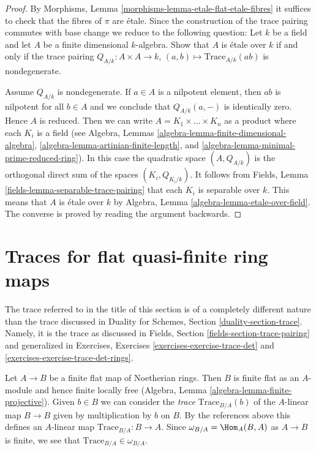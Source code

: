 \begin{proof}
By Morphisms, Lemma \ref{morphisms-lemma-etale-flat-etale-fibres}
it suffices to check that the fibres of $\pi$ are \'etale.
Since the construction of the trace pairing commutes with base
change we reduce to the following question: Let $k$ be a field
and let $A$ be a finite dimensional $k$-algebra. Show that
$A$ is \'etale over $k$ if and only if the trace pairing
$Q_{A/k} : A \times A \to k$, $(a, b) \mapsto \text{Trace}_{A/k}(ab)$
is nondegenerate.

\medskip\noindent
Assume $Q_{A/k}$ is nondegenerate. If $a \in A$ is a nilpotent element, then
$ab$ is nilpotent for all $b \in A$ and we conclude that $Q_{A/k}(a, -)$ is
identically zero. Hence $A$ is reduced. Then we can write
$A = K_1 \times \ldots \times K_n$ as a product where each $K_i$
is a field (see
Algebra, Lemmas \ref{algebra-lemma-finite-dimensional-algebra},
\ref{algebra-lemma-artinian-finite-length}, and
\ref{algebra-lemma-minimal-prime-reduced-ring}).
In this case the quadratic
space $(A, Q_{A/k})$ is the orthogonal direct sum of the spaces
$(K_i, Q_{K_i/k})$. It follows from
Fields, Lemma \ref{fields-lemma-separable-trace-pairing}
that each $K_i$ is separable over $k$. This means that $A$ is \'etale
over $k$ by Algebra, Lemma \ref{algebra-lemma-etale-over-field}.
The converse is proved by reading the argument backwards.
\end{proof}





\section{Traces for flat quasi-finite ring maps}
\label{section-quasi-finite-traces}

\noindent
The trace referred to in the title of this section is of a completely
different nature than the trace discussed in
Duality for Schemes, Section \ref{duality-section-trace}.
Namely, it is the trace
as discussed in Fields, Section \ref{fields-section-trace-pairing}
and generalized in Exercises, Exercises \ref{exercises-exercise-trace-det} and
\ref{exercises-exercise-trace-det-rings}.

\medskip\noindent
Let $A \to B$ be a finite flat map of Noetherian rings. Then $B$ is finite
flat as an $A$-module and hence finite locally free
(Algebra, Lemma \ref{algebra-lemma-finite-projective}).
Given $b \in B$ we can consider the {\it trace} $\text{Trace}_{B/A}(b)$
of the $A$-linear map $B \to B$ given by
multiplication by $b$ on $B$. By the references above this defines
an $A$-linear map $\text{Trace}_{B/A} : B \to A$.
Since $\omega_{B/A} = \Hom_A(B, A)$ as $A \to B$ is finite, we see
that $\text{Trace}_{B/A} \in \omega_{B/A}$.


